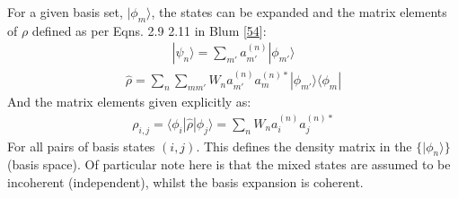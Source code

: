 \documentclass[letterpaper,table,10pt,english]{jupyterBook}
\begin{document}
\sphinxAtStartPar
For a given basis set, \(|\phi_{m}\rangle\), the states can be expanded and the matrix elements of \(\rho\) defined as per Eqns. 2.9 \sphinxhyphen{} 2.11 in Blum {[}\hyperlink{cite.backmatter/bibliography:id479}{54}{]}:
\begin{equation*}
\begin{split}
| \psi_{n} \rangle = \sum_{m'} a_{m'}^{(n)}| \phi_{m'}\rangle
\end{split}
\end{equation*}\begin{equation}\label{equation:part1/theory_density_matrices_310123:eqn:density-mat-outer-prod}
\begin{split}
\hat{\rho}=\sum_{n}\sum_{mm'}W_{n}a_{m'}^{(n)}a_{m}^{(n)*}|\phi_{m'}\rangle\langle\phi_{m}|
\end{split}
\end{equation}
\sphinxAtStartPar
And the matrix elements \sphinxhyphen{}  \sphinxhyphen{} given explicitly as:
\begin{equation}\label{equation:part1/theory_density_matrices_310123:eqn:density-mat-generic}
\begin{split}
\rho_{i,j}=\langle\phi_{i}|\hat{\rho}|\phi_{j}\rangle=\sum_{n}W_{n}a_{i}^{(n)}a_{j}^{(n)*}
\end{split}
\end{equation}
\sphinxAtStartPar
For all pairs of basis states \((i,j)\). This defines the density matrix in the \(\{|\phi_n\rangle\}\)  (basis space). Of particular note here is that the mixed states are assumed to be incoherent (independent), whilst the basis expansion is coherent.
\end{document}
